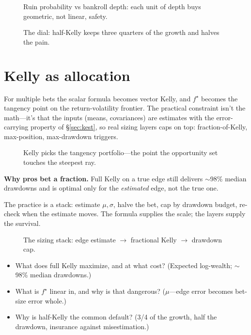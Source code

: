 \begin{figure}[htbp]\centering

\caption{Ruin probability vs bankroll depth: each unit of depth buys geometric, not
linear, safety.}
\label{fig:ruin}
\end{figure}

\begin{figure}[htbp]\centering

\caption{The dial: half-Kelly keeps three quarters of the growth and halves the pain.}
\label{fig:halves}
\end{figure}

\section{Kelly as allocation}\label{sec:kalloc}

For multiple bets the scalar formula becomes vector Kelly, and $f^\star$ becomes the
tangency point on the return-volatility frontier. The practical constraint isn't the
math---it's that the inputs (means, covariances) are estimates with the error-carrying
property of \S\ref{sec:kest}, so real sizing layers caps on top: fraction-of-Kelly,
max-position, max-drawdown triggers.

\begin{figure}[htbp]\centering

\caption{Kelly picks the tangency portfolio---the point the opportunity set touches the
steepest ray.}
\label{fig:frontier}
\end{figure}

\begin{example}\label{ex:kalloc}
\textbf{Why pros bet a fraction.} Full Kelly on a true edge still delivers $\sim$98\%
median drawdowns and is optimal only for the \emph{estimated} edge, not the true one.
\begin{solution}
The practice is a stack: estimate $\mu,\sigma$, halve the bet, cap by drawdown budget,
re-check when the estimate moves. The formula supplies the scale; the layers supply
the survival.
\end{solution}
\end{example}

\begin{figure}[htbp]\centering

\caption{The sizing stack: edge estimate $\to$ fractional Kelly $\to$ drawdown cap.}
\label{fig:decide}
\end{figure}

\begin{checkpoint}
\begin{itemize}
\item What does full Kelly maximize, and at what cost? (Expected log-wealth; $\sim$98\%
median drawdowns.)
\item What is $f^\star$ linear in, and why is that dangerous? ($\mu$---edge error becomes
bet-size error whole.)
\item Why is half-Kelly the common default? (3/4 of the growth, half the drawdown,
insurance against misestimation.)
\end{itemize}
\end{checkpoint}

